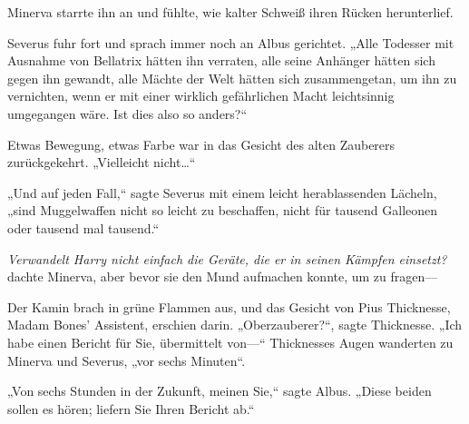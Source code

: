 Minerva starrte ihn an und fühlte, wie kalter Schweiß ihren Rücken herunterlief.

Severus fuhr fort und sprach immer noch an Albus gerichtet. „Alle Todesser mit Ausnahme von Bellatrix hätten ihn verraten, alle seine Anhänger hätten sich gegen ihn gewandt, alle Mächte der Welt hätten sich zusammengetan, um ihn zu vernichten, wenn er mit einer wirklich gefährlichen Macht leichtsinnig umgegangen wäre. Ist dies also so anders?“

Etwas Bewegung, etwas Farbe war in das Gesicht des alten Zauberers zurückgekehrt. „Vielleicht nicht…“

„Und auf jeden Fall,“ sagte Severus mit einem leicht herablassenden Lächeln, „sind Muggelwaffen nicht so leicht zu beschaffen, nicht für tausend Galleonen oder tausend mal tausend.“

\emph{Verwandelt Harry nicht einfach die Geräte, die er in seinen Kämpfen einsetzt?} dachte Minerva, aber bevor sie den Mund aufmachen konnte, um zu fragen—

Der Kamin brach in grüne Flammen aus, und das Gesicht von Pius Thicknesse, Madam Bones' Assistent, erschien darin. „Oberzauberer?“, sagte Thicknesse. „Ich habe einen Bericht für Sie, übermittelt von—“ Thicknesses Augen wanderten zu Minerva und Severus, „vor sechs Minuten“.

„Von sechs Stunden in der Zukunft, meinen Sie,“ sagte Albus. „Diese beiden sollen es hören; liefern Sie Ihren Bericht ab.“

